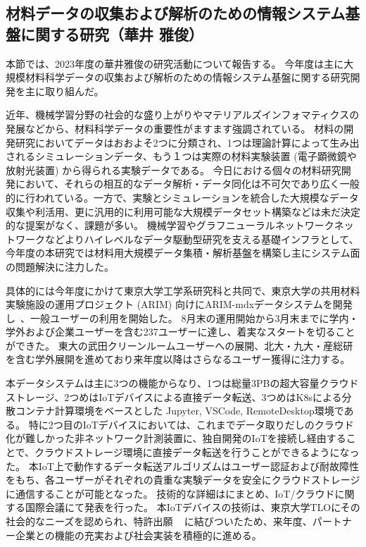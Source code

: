 \subsection{材料データの収集および解析のための情報システム基盤に関する研究（華井 雅俊）}

本節では、2023年度の華井雅俊の研究活動について報告する。
今年度は主に大規模材料科学データの収集および解析のための情報システム基盤に関する研究開発を主に取り組んだ。

近年、機械学習分野の社会的な盛り上がりやマテリアルズインフォマティクスの発展などから、材料科学データの重要性がますます強調されている。
材料の開発研究においてデータはおおよそ2つに分類され、1つは理論計算によって生み出されるシミュレーションデータ、もう１つは実際の材料実験装置 (電子顕微鏡や放射光装置) から得られる実験データである。
今日における個々の材料研究開発において、それらの相互的なデータ解析・データ同化は不可欠であり広く一般的に行われている。一方で、実験とシミュレーションを統合した大規模なデータ収集や利活用、更に汎用的に利用可能な大規模データセット構築などは未だ決定的な提案がなく、課題が多い。
機械学習やグラフニューラルネットワークネットワークなどよりハイレベルなデータ駆動型研究を支える基礎インフラとして、今年度の本研究では材料用大規模データ集積・解析基盤を構築し主にシステム面の問題解決に注力した。

具体的には今年度にかけて東京大学工学系研究科と共同で、東京大学の共用材料実験施設の運用プロジェクト (ARIM) 向けにARIM-mdxデータシステムを開発し~\cite{hanai-arim-mdx}、一般ユーザーの利用を開始した。
8月末の運用開始から3月末までに学内・学外および企業ユーザーを含む237ユーザーに達し、着実なスタートを切ることができた。
東大の武田クリーンルームユーザーへの展開、北大・九大・産総研を含む学外展開を進めており来年度以降はさらなるユーザー獲得に注力する。

本データシステムは主に3つの機能からなり、1つは総量3PBの超大容量クラウドストレージ、2つめはIoTデバイスによる直接データ転送、3つめはK8sによる分散コンテナ計算環境をベースとした Jupyter, VSCode, RemoteDesktop環境である。
特に2つ目のIoTデバイスにおいては、これまでデータ取りだしのクラウド化が難しかった非ネットワーク計測装置に、独自開発のIoTを接続し経由することで、クラウドストレージ環境に直接データ転送を行うことができるようになった。
本IoT上で動作するデータ転送アルゴリズムはユーザー認証および耐故障性をもち、各ユーザーがそれぞれの貴重な実験データを安全にクラウドストレージに通信することが可能となった。
技術的な詳細は\cite{hanai-UCC}にまとめ、IoT/クラウドに関する国際会議にて発表を行った。
本IoTデバイスの技術は、東京大学TLOにその社会的なニーズを認められ、特許出願 ~\cite{hanai-iot} に結びついたため、来年度、パートナー企業との機能の充実および社会実装を積極的に進める。




